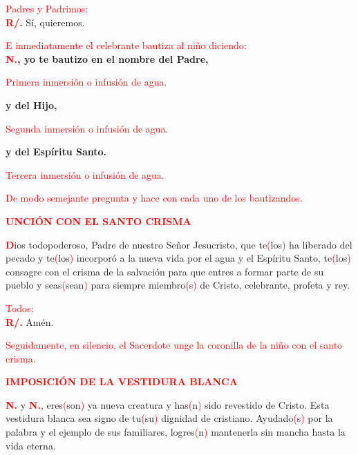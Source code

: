 \documentclass[12pt, letterpaper, spanish]{article}
\begin{document}
  \large {\textcolor{red}{Padres y Padrimos:}}\\
  \Large {\bfseries \textcolor{red}{R/.}} \hspace{0.5cm} S\'i, quieremos.

  \large {\textcolor{red}{E inmediatamente el celebrante bautiza al ni\~no diciendo:}}\\
  \LARGE{ \bfseries \textcolor{red}{N.}, yo te bautizo en el nombre del Padre,}

  \large {\textcolor{red}{Primera inmersi\'on o infusi\'on de agua.}}

  \noindent
  \LARGE {\bfseries y del Hijo,}

  \large {\textcolor{red}{Segunda inmersi\'on o infusi\'on de agua.}}

  \noindent
  \LARGE {\bfseries y del Esp\'iritu Santo.}

  \large {\textcolor{red}{Tercera inmersi\'on o infusi\'on de agua.}}

  \large {\textcolor{red}{De modo semejante pregunta y hace con cada uno de los bautizandos.}}

  \Large {\bfseries \textcolor{red}{UNCI\'ON CON EL SANTO CRISMA}} 

  \lettrine[lines=2]{\bfseries \textcolor{red}{D}}{}\Large ios todopoderoso, Padre de nuestro Se\~nor Jesucristo, que te\textcolor{red}{(}los\textcolor{red}{)} ha liberado del pecado y te\textcolor{red}{(}los\textcolor{red}{)} incorpor\'o a la nueva vida por el agua y el Esp\'iritu Santo, te\textcolor{red}{(}los\textcolor{red}{)} consagre con el crisma de la salvaci\'on para que entres a formar parte de su pueblo y seas\textcolor{red}{(}sean\textcolor{red}{)} para siempre miembro\textcolor{red}{(}s\textcolor{red}{)} de Cristo, celebrante, profeta y rey.

  \large {\textcolor{red}{Todos:}} \\
  \Large {\bfseries \textcolor{red}{R/.}} \hspace{0.5cm} Am\'en. 

  \large {\textcolor{red}{Seguidamente, en silencio, el Sacerdote unge la coronilla de la ni\~no con el santo crisma.}}

  \Large {\bfseries \textcolor{red}{IMPOSICI\'ON DE LA VESTIDURA BLANCA}} 

  \noindent
  \Large {{\bfseries \textcolor{red}{N.}} y {\bfseries \textcolor{red}{N.}}, eres\textcolor{red}{(}son\textcolor{red}{)} ya nueva creatura y has\textcolor{red}{(}n\textcolor{red}{)} sido revestido de Cristo. Esta vestidura blanca sea signo de tu\textcolor{red}{(}su\textcolor{red}{)} dignidad de cristiano. Ayudado\textcolor{red}{(}s\textcolor{red}{)} por la palabra y el ejemplo de sus familiares, logres\textcolor{red}{(}n\textcolor{red}{)} mantenerla sin mancha hasta la vida eterna. }
\end{document}
